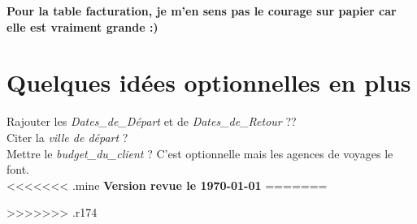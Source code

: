 \documentclass[10pt]{article}
\begin{document}

\textbf{Pour la table facturation, je m'en sens pas le courage sur papier car elle est vraiment grande :) }

\section{Quelques idées optionnelles en plus}
Rajouter les \textit{Dates\_de\_Départ} et de \textit{Dates\_de\_Retour} ?? \\
Citer la \textit{ville de départ} ? \\
Mettre le \textit{budget\_du\_client} ? C'est optionnelle mais les agences de voyages le font. \\

<<<<<<< .mine
\textbf{Version revue le \today}
=======

>>>>>>> .r174
\end{document}
